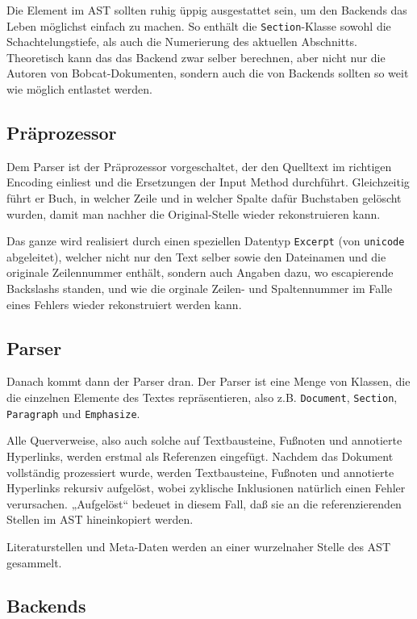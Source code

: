 \documentclass[12pt,openany]{book}
\begin{document}
\bigskip
%
Die Element im AST sollten ruhig üppig ausgestattet sein, um den Backends das
Leben möglichst einfach zu machen.  So enthält die \lstinline{Section}-Klasse
sowohl die Schachtelungstiefe, als auch die Numerierung des aktuellen
Abschnitts.  Theoretisch kann das das Backend zwar selber berechnen, aber nicht
nur die Autoren von Bobcat-Dokumenten, sondern auch die von Backends sollten so
weit wie möglich entlastet werden.

\subsection{Präprozessor}

Dem Parser ist der Präprozessor vorgeschaltet, der den Quelltext im richtigen
Encoding einliest und die Ersetzungen der Input Method durchführt.
Gleichzeitig führt er Buch, in welcher Zeile und in welcher Spalte dafür
Buchstaben gelöscht wurden, damit man nachher die Original-Stelle wieder
rekonstruieren kann.

Das ganze wird realisiert durch einen speziellen Datentyp \verb|Excerpt| (von
\verb|unicode| abgeleitet), welcher nicht nur den Text selber sowie den
Dateinamen und die originale Zeilennummer enthält, sondern auch Angaben dazu,
wo escapierende Backslashs standen, und wie die orginale Zeilen- und
Spaltennummer im Falle eines Fehlers wieder rekonstruiert werden kann.

\subsection{Parser}

Danach kommt dann der Parser dran.  Der Parser ist eine Menge von Klassen, die
die einzelnen Elemente des Textes repräsentieren, also z.B. \verb|Document|,
\verb|Section|, \verb|Paragraph| und \verb|Emphasize|.

Alle Querverweise, also auch solche auf Textbausteine, Fußnoten und annotierte
Hyperlinks, werden erstmal als Referenzen eingefügt.  Nachdem das Dokument
vollständig prozessiert wurde, werden Textbausteine, Fußnoten und annotierte
Hyperlinks rekursiv aufgelöst, wobei zyklische Inklusionen natürlich einen
Fehler verursachen.  „Aufgelöst“ bedeuet in diesem Fall, daß sie an die
referenzierenden Stellen im AST hineinkopiert werden.

Literaturstellen und Meta-Daten werden an einer wurzelnaher Stelle des AST
gesammelt.

\subsection{Backends}
\end{document}
